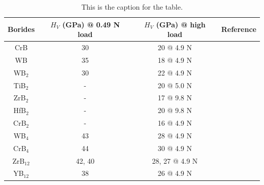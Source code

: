 \lipsum[2-4]




\vspace{24pt}


	\setlength{\tabcolsep}{12pt} %
	\renewcommand{\arraystretch}{1.5} %
    \begin{table}[htb]
    \captionsetup{singlelinecheck = false, justification=justified}
    \caption[caption in contents of tables]{This is the caption for the table.}
    \label{tab:1}
    \begin{tabular*}{\textwidth}{c|c|c|c}
        Borides  & {$H_V$ (GPa) @ 0.49 N load} & $H_V$ (GPa) @ high load & Reference  \\ \hline
        CrB       &  30   & 20 @ 4.9 N   & ~\cite{CrB_han2015hardness} \\
        WB        &  35   & 18 @ 4.9 N   &
        ~\cite{WB_yeung2016superhard} \\
        WB$_2$    &  30   & 22 @ 4.9 N   &
        ~\cite{pangilinan2018superhard} \\
        TiB$_2$   &  -    & 20 @ 5.0 N   & ~\cite{TiB2_munro2000material} \\
        ZrB$_2$   &  -    & 17 @ 9.8 N   & ~\cite{ZrB2_HfB2_zapata2013mechanical} \\
        HfB$_2$   &  -    & 20 @ 9.8 N   & ~\cite{ZrB2_HfB2_zapata2013mechanical} \\
        CrB$_2$   &  -    & 16 @ 4.9 N   & ~\cite{CrB2_CrB4_wang2014crystal} \\
        WB$_4$    &  43   & 28 @ 4.9 N   & ~\cite{WB4_mohammadi2011tungsten} \\
        CrB$_4$   &  44   & 30 @ 4.9 N   & ~\cite{CrB2_CrB4_wang2014crystal} \\  
        ZrB$_{12}$&  42, 40   & 28, 27 @ 4.9 N   & ~\cite{YB12_akopov2019synthesis, ZrB12_ma2017ultrastrong} \\
        YB$_{12}$ &  38   & 26 @ 4.9 N   & ~\cite{YB12_akopov2019synthesis} \\
    \end{tabular*}
    \end{table}

\vspace{24pt}

